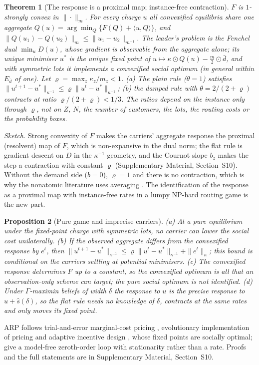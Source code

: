 \documentclass[preprint,11pt]{elsarticle}
\newtheorem{theorem}{Theorem}
\newtheorem{proposition}[theorem]{Proposition}
\theoremstyle{definition}
\theoremstyle{remark}
\newcommand{\ip}[2]{\langle #1,#2\rangle}
\newcommand{\SM}[1]{Supplementary Material, Section~#1}
\begin{document}
\begin{theorem}[The response is a proximal map; instance-free contraction]\label{thm:resolvent}\label{thm:rate}
$F$ is $1$-strongly convex in $\|\cdot\|_m$. For every charge $u$ all convexified equilibria share one aggregate $Q(u)=\arg\min_Q\{F(Q)+\ip uQ\}$, and $\|Q(u_1)-Q(u_2)\|_m\le\|u_1-u_2\|_{m^{-1}}$. The leader's problem is the Fenchel dual $\min_uD(u)$, whose gradient is observable from the aggregate alone; its unique minimiser $u^*$ is the unique fixed point of $u\mapsto\kappa\odot Q(u)-\tfrac m2\odot\bar d$, and with symmetric lots it implements a convexified social optimum (in general within $E_{\bar d}$ of one). Let $\varrho=\max_z\kappa_z/m_z<1$. (a) The plain rule ($\theta=1$) satisfies $\|u^{t+1}-u^*\|_{\kappa^{-1}}\le\varrho\|u^t-u^*\|_{\kappa^{-1}}$; (b) the damped rule with $\theta=2/(2+\varrho)$ contracts at ratio $\varrho/(2+\varrho)<1/3$. The ratios depend on the instance only through $\varrho$, not on $Z$, $N$, the number of customers, the lots, the routing costs or the probability boxes.
\end{theorem}
\emph{Sketch.} Strong convexity of $F$ makes the carriers' aggregate response the proximal (resolvent) map of $F$, which is non-expansive in the dual norm; the flat rule is gradient descent on $D$ in the $\kappa^{-1}$ geometry, and the Cournot slope $b_z$ makes the step a contraction with constant $\varrho$ (\SM{S10}). Without the demand side ($b=0$), $\varrho=1$ and there is no contraction, which is why the nonatomic literature uses averaging \citep{Yang2004}. The identification of the response as a proximal map with instance-free rates in a lumpy NP-hard routing game is the new part.

\begin{proposition}[Pure game and imprecise carriers]\label{thm:pure}\label{prop:arpcredal}
(a) At a pure equilibrium under the fixed-point charge with symmetric lots, no carrier can lower the social cost unilaterally. (b) If the observed aggregate differs from the convexified response by $e^t$, then $\|u^{t+1}-u^*\|_{\kappa^{-1}}\le\varrho\|u^t-u^*\|_{\kappa^{-1}}+\|e^t\|_\kappa$; this bound is conditional on the carriers settling at potential minimisers. (c) The convexified response determines $F$ up to a constant, so the convexified optimum is all that an observation-only scheme can target; the pure social optimum is not identified. (d) Under $\Gamma$-maximin beliefs of width $\delta$ the response to $u$ is the precise response to $u+\hat s(\delta)$, so the flat rule needs no knowledge of $\delta$, contracts at the same rates and only moves its fixed point.
\end{proposition}
ARP follows trial-and-error marginal-cost pricing \citep{Yang2004,HanYang2009,YeYangTan2015}, evolutionary implementation of pricing \citep{Sandholm2002} and adaptive incentive design \citep{Maheshwari2022,Maheshwari2026}, whose fixed points are socially optimal; \citet{Masiha2026} give a model-free zeroth-order loop with stationarity rather than a rate. Proofs and the full statements are in \SM{S10}.
\end{document}
